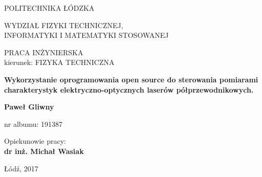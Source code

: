 \begin{titlepage}
 \begin{center}

  \vspace{0.5cm}
  \large{POLITECHNIKA ŁÓDZKA}

  \vspace{1cm}
  \normalsize{WYDZIAŁ FIZYKI TECHNICZNEJ, \\
  INFORMATYKI I MATEMATYKI STOSOWANEJ}

  \vspace{1.5cm}
  \large{PRACA INŻYNIERSKA \\kierunek: FIZYKA TECHNICZNA}

  \vspace{2cm}
  \Large\textbf{{Wykorzystanie oprogramowania open source do
    sterowania pomiarami charakterystyk
    elektryczno-optycznych laserów
    półprzewodnikowych.}}

  \vspace{2cm}
  \large\textbf{Paweł Gliwny}

  \large{nr albumu: 191387}

  \vspace{1cm}
  \begin{flushright}
  \large{Opiekunowie pracy:\\ \textbf{dr inż. Michał Wasiak}}
  \end{flushright}

  \vfill
  \normalsize{Łódź, 2017}
  \end{center}
\end{titlepage}